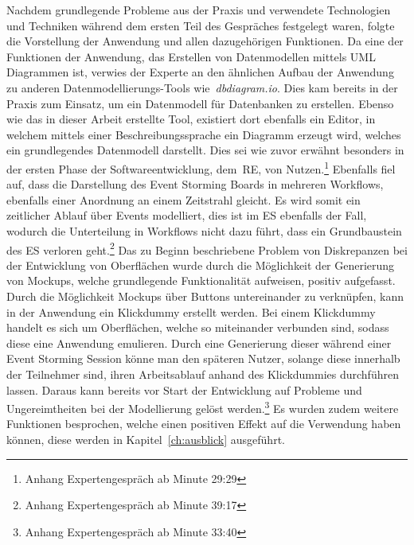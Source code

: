 Nachdem grundlegende Probleme aus der Praxis und verwendete Technologien und Techniken während dem ersten Teil des Gespräches festgelegt waren,
folgte die Vorstellung der Anwendung und allen dazugehörigen Funktionen.
Da eine der Funktionen der Anwendung, das Erstellen von Datenmodellen mittels UML Diagrammen ist, verwies der Experte an den ähnlichen Aufbau der Anwendung
zu anderen Datenmodellierungs-Tools wie~\textit{dbdiagram.io}.
Dies kam bereits in der Praxis zum Einsatz, um ein Datenmodell für Datenbanken zu erstellen.
Ebenso wie das in dieser Arbeit erstellte Tool, existiert dort ebenfalls ein Editor, in welchem mittels einer Beschreibungssprache ein Diagramm erzeugt wird,
welches ein grundlegendes Datenmodell darstellt.
Dies sei wie zuvor erwähnt besonders in der ersten Phase der Softwareentwicklung, dem~\ac{RE}, von Nutzen.\footnote{Anhang Expertengespräch ab Minute 29:29}\newline
Ebenfalls fiel auf, dass die Darstellung des Event Storming Boards in mehreren Workflows, ebenfalls einer Anordnung an einem Zeitstrahl gleicht.
Es wird somit ein zeitlicher Ablauf über Events modelliert, dies ist im \ac{ES} ebenfalls der Fall, wodurch die Unterteilung in Workflows nicht dazu führt,
dass ein Grundbaustein des \ac{ES} verloren geht.\footnote{Anhang Expertengespräch ab Minute 39:17}\newline
Das zu Beginn beschriebene Problem von Diskrepanzen bei der Entwicklung von Oberflächen wurde durch die Möglichkeit der Generierung von
Mockups, welche grundlegende Funktionalität aufweisen, positiv aufgefasst.
Durch die Möglichkeit Mockups über Buttons untereinander zu verknüpfen, kann in der Anwendung ein Klickdummy erstellt werden.
Bei einem Klickdummy handelt es sich um Oberflächen, welche so miteinander verbunden sind, sodass diese eine Anwendung emulieren.
Durch eine Generierung dieser während einer Event Storming Session könne man den späteren Nutzer, solange diese innerhalb der Teilnehmer sind,
ihren Arbeitsablauf anhand des Klickdummies durchführen lassen.
Daraus kann bereits vor Start der Entwicklung auf Probleme und Ungereimtheiten bei der Modellierung gelöst werden.\footnote{Anhang Expertengespräch ab Minute 33:40}\newline
Es wurden zudem weitere Funktionen besprochen, welche einen positiven Effekt auf die Verwendung haben können, diese werden in Kapitel~\ref{ch:ausblick} ausgeführt.
